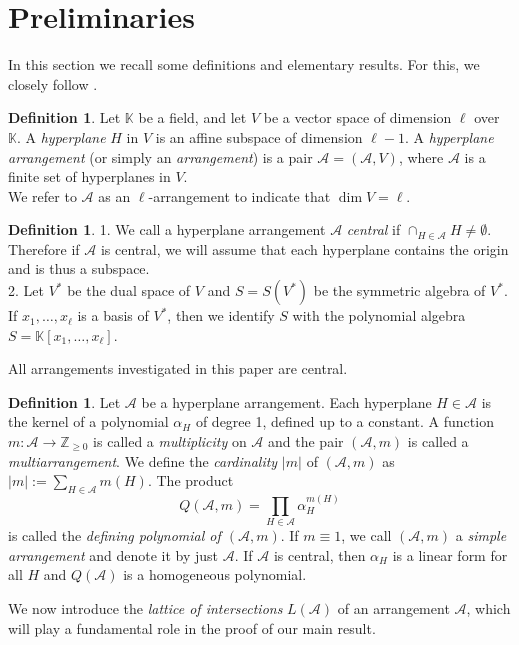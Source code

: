\documentclass[12pt]{amsart}
\theoremstyle{definition}
\newtheorem{definition}[theorem]{Definition}
\theoremstyle{remark}
\newcommand\CA{{\mathscr A}}
\newcommand\KK{{\mathbb K}}
\begin{document}
\section{Preliminaries}
In this section we recall some definitions and elementary results. For this, we closely follow \cite{MR1217488}. 
\begin{definition}
Let $\KK$ be a field, and let $V$ be a vector space of dimension $\ell$ over $\KK$. A \emph{hyperplane} $H$ in $V$ is an affine subspace of dimension $\ell-1$. A \emph{hyperplane arrangement} (or simply an \emph{arrangement}) is a pair $\CA = (\CA, V)$, where $\CA$ is a finite set of hyperplanes in $V$.\\
We refer to $\CA$ as an $\ell$-arrangement to indicate that $\dim V=\ell$.
\end{definition}

\begin{definition}
1. We call a hyperplane arrangement $\CA$ \emph{central} if $\cap_{H \in \CA} H \neq \emptyset$. Therefore if $\CA$ is central, we will assume that each hyperplane contains the origin and is thus a subspace.\\
2. Let $V^*$ be the dual space of $V$ and $S = S(V^*)$ be the symmetric algebra of $V^*$. If $x_1, \ldots , x_\ell$ is a basis of $V^*$, then we identify $S$ with the polynomial algebra $S = \mathbb{K}[x_{1}, \ldots, x_\ell]$.
\end{definition}

All arrangements investigated in this paper are central. 

\begin{definition}
    Let $\CA$ be a hyperplane arrangement. Each hyperplane $H \in \CA$ is the kernel of a polynomial $\alpha_H$ of degree 1, defined up to a constant. A function $m:\CA\to \mathbb{Z}_{\geq0}$ is called a \emph{multiplicity} on $\CA$ and the pair $(\CA,m)$ is called a \emph{multiarrangement}. We define the \emph{cardinality} $\vert m\vert$ of $(\CA,m)$ as $\vert m\vert:=\sum_{H\in\CA}m(H)$. The product \[Q(\CA,m) = \prod_{H \in \CA} \alpha_H^{m(H)}\] is called the \emph{defining polynomial of $(\CA,m)$}. If $m\equiv 1$, we call $(\CA,m)$ a \emph{simple arrangement} and denote it by just $\CA$. If $\CA$ is central, then $\alpha_H$ is a linear form for all $H$ and $Q(\CA)$ is a homogeneous polynomial.
\end{definition}

We now introduce the \emph{lattice of intersections} $L(\CA)$ of an arrangement $\CA$, which will play a fundamental role in the proof of our main result.
\end{document}
